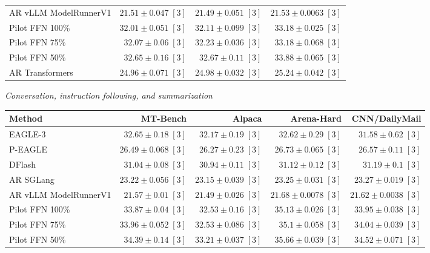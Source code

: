 \begin{table}[!htp]
\begin{tabular}{@{}>{\raggedright\arraybackslash}p{3.7cm}rrr@{}}
AR \textperiodcentered{} vLLM ModelRunnerV1 & \(\mathbf{21.51} \pm 0.047\;[3]\) & \(\mathbf{21.49} \pm 0.051\;[3]\) & \(\mathbf{21.53} \pm 0.0063\;[3]\) \\
Pilot FFN 100\% & \(32.01 \pm 0.051\;[3]\) & \(32.11 \pm 0.099\;[3]\) & \(33.18 \pm 0.025\;[3]\) \\
Pilot FFN 75\% & \(32.07 \pm 0.06\;[3]\) & \(32.23 \pm 0.036\;[3]\) & \(33.18 \pm 0.068\;[3]\) \\
Pilot FFN 50\% & \(32.65 \pm 0.16\;[3]\) & \(32.67 \pm 0.11\;[3]\) & \(33.88 \pm 0.065\;[3]\) \\
AR \textperiodcentered{} Transformers & \(24.96 \pm 0.071\;[3]\) & \(24.98 \pm 0.032\;[3]\) & \(25.24 \pm 0.042\;[3]\) \\
\bottomrule
\end{tabular}\par\medskip
\textit{Conversation, instruction following, and summarization}\par\smallskip
\begin{tabular}{@{}>{\raggedright\arraybackslash}p{3.7cm}rrrr@{}}
\toprule
Method & MT-Bench & Alpaca & Arena-Hard & CNN/DailyMail \\
\midrule
EAGLE-3 & \(32.65 \pm 0.18\;[3]\) & \(32.17 \pm 0.19\;[3]\) & \(32.62 \pm 0.29\;[3]\) & \(31.58 \pm 0.62\;[3]\) \\
P-EAGLE & \(26.49 \pm 0.068\;[3]\) & \(26.27 \pm 0.23\;[3]\) & \(26.73 \pm 0.065\;[3]\) & \(26.57 \pm 0.11\;[3]\) \\
DFlash & \(31.04 \pm 0.08\;[3]\) & \(30.94 \pm 0.11\;[3]\) & \(31.12 \pm 0.12\;[3]\) & \(31.19 \pm 0.1\;[3]\) \\
AR \textperiodcentered{} SGLang & \(23.22 \pm 0.056\;[3]\) & \(23.15 \pm 0.039\;[3]\) & \(23.25 \pm 0.031\;[3]\) & \(23.27 \pm 0.019\;[3]\) \\
AR \textperiodcentered{} vLLM ModelRunnerV1 & \(\mathbf{21.57} \pm 0.01\;[3]\) & \(\mathbf{21.49} \pm 0.026\;[3]\) & \(\mathbf{21.68} \pm 0.0078\;[3]\) & \(\mathbf{21.62} \pm 0.0038\;[3]\) \\
Pilot FFN 100\% & \(33.87 \pm 0.04\;[3]\) & \(32.53 \pm 0.16\;[3]\) & \(35.13 \pm 0.026\;[3]\) & \(33.95 \pm 0.038\;[3]\) \\
Pilot FFN 75\% & \(33.96 \pm 0.052\;[3]\) & \(32.53 \pm 0.086\;[3]\) & \(35.1 \pm 0.058\;[3]\) & \(34.04 \pm 0.039\;[3]\) \\
Pilot FFN 50\% & \(34.39 \pm 0.14\;[3]\) & \(33.21 \pm 0.037\;[3]\) & \(35.66 \pm 0.039\;[3]\) & \(34.52 \pm 0.071\;[3]\) \\

\end{tabular}
\end{table}
